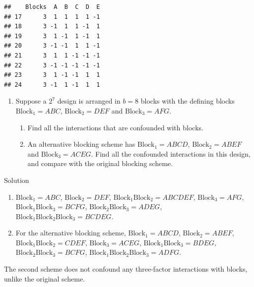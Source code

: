\documentclass[
]{book}
\theoremstyle{definition}
\theoremstyle{definition}
\theoremstyle{definition}
\theoremstyle{definition}
\theoremstyle{remark}
\begin{document}
\begin{verbatim}
##    Blocks  A  B  C  D  E
## 17      3  1  1  1  1 -1
## 18      3 -1  1  1 -1  1
## 19      3  1 -1  1 -1  1
## 20      3 -1 -1  1  1 -1
## 21      3  1  1 -1 -1 -1
## 22      3 -1 -1 -1 -1 -1
## 23      3  1 -1 -1  1  1
## 24      3 -1  1 -1  1  1
\end{verbatim}

\begin{enumerate}
\def\labelenumi{\arabic{enumi}.}
\setcounter{enumi}{1}
\item
  Suppose a \(2^7\) design is arranged in \(b=8\) blocks with the defining blocks \(\mathrm{Block}_1 = ABC\), \(\mathrm{Block}_2 = DEF\) and \(\mathrm{Block}_3 = AFG\).

  \begin{enumerate}
  \def\labelenumii{\alph{enumii}.}
  \item
    Find all the interactions that are confounded with blocks.
  \item
    An alternative blocking scheme has \(\mathrm{Block}_1 = ABCD\), \(\mathrm{Block}_2 = ABEF\) and \(\mathrm{Block}_3 = ACEG\). Find all the confounded interactions in this design, and compare with the original blocking scheme.
  \end{enumerate}
\end{enumerate}

Solution

\begin{enumerate}
\def\labelenumi{\alph{enumi}.}
\item
  \(\mathrm{Block}_1 = ABC\), \(\mathrm{Block}_2 = DEF\), \(\mathrm{Block}_1\mathrm{Block}_2 = ABCDEF\), \(\mathrm{Block}_3 = AFG\), \(\mathrm{Block}_1\mathrm{Block}_3 = BCFG\), \(\mathrm{Block}_2\mathrm{Block}_3 = ADEG\), \(\mathrm{Block}_1\mathrm{Block}_2\mathrm{Block}_3 = BCDEG\).
\item
  For the alternative blocking scheme, \(\mathrm{Block}_1 = ABCD\), \(\mathrm{Block}_2 = ABEF\), \(\mathrm{Block}_1\mathrm{Block}_2 = CDEF\), \(\mathrm{Block}_3 = ACEG\), \(\mathrm{Block}_1\mathrm{Block}_3 = BDEG\), \(\mathrm{Block}_2\mathrm{Block}_3 = BCFG\), \(\mathrm{Block}_1\mathrm{Block}_2\mathrm{Block}_3 = ADFG\).
\end{enumerate}

The second scheme does not confound any three-factor interactions with blocks, unlike the original scheme.
\end{document}
